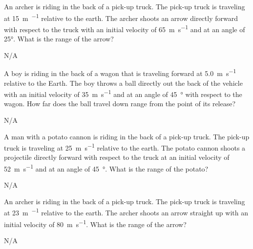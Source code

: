 


\begin{question}[ID=relative-A-Q01,topic=relative-motion,difficulty=A]
    An archer is riding in the back of a pick-up truck.
    The pick-up truck is traveling at \SI{15}{\meter\per\secodn}
        relative to the earth.
    The archer shoots an arrow directly forward with respect to the truck
        with an initial velocity of \SI{65}{\meter\per\second} and
        at an angle of \ang{25}.
    What is the range of the arrow?
\end{question}
\begin{solution}
    N/A
\end{solution}


\begin{question}[ID=relative-A-Q02,topic=relative-motion,difficulty=A]
    A boy is riding in the back of a wagon that is traveling
        forward at \SI{5.0}{\meter\per\second} relative to the Earth.
    The boy throws a ball directly out the back of the vehicle
        with an initial velocity of \SI{35}{\meter\per\second}
        and at an angle of \SI{45}{\degree} with respect to
        the wagon.
    How far does the ball travel down range from the point of
        its release?
\end{question}
\begin{solution}
    N/A
\end{solution}


\begin{question}[ID=relative-A-Q03,topic=relative-motion,difficulty=A]
    A man with a potato cannon is riding in the back of a pick-up truck.
    The pick-up truck is traveling at \SI{25}{\meter\per\second}
        relative to the earth.
    The potato cannon shoots a projectile directly forward with
        respect to the truck at an initial velocity of
        \SI{52}{\meter\per\second} and at an angle of \SI{45}{\degree}.
    What is the range of the potato?
\end{question}
\begin{solution}
    N/A
\end{solution}


\begin{question}[ID=relative-A-Q04,topic=relative-motion,difficulty=A]
    An archer is riding in the back of a pick-up truck.
    The pick-up truck is traveling at \SI{23}{\meter\per\secodn}
        relative to the earth.
    The archer shoots an arrow straight up with an initial velocity
        of \SI{80}{\meter\per\second}.
    What is the range of the arrow?
\end{question}
\begin{solution}
    N/A
\end{solution}


